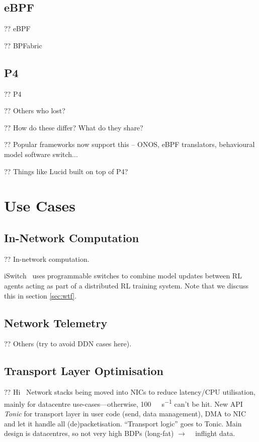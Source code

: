 \subsection{eBPF}
?? eBPF

?? BPFabric

\subsection{P4}
?? P4

?? Others who lost?

?? How do these differ? What do they share?

?? Popular frameworks now support this -- ONOS, eBPF translators, behavioural model software switch...

?? Things like Lucid built on top of P4?~\parencite{DBLP:conf/sigcomm/SonchackLRW21}

\section{Use Cases}

\subsection{In-Network Computation}\label{sec:in-network-computation}
?? In-network computation.

iSwitch~\cite{DBLP:conf/isca/LiLYCSH19} uses programmable switches to combine model updates between RL agents acting as part of a distributed RL training system.
Note that we discuss this in section \ref{sec:wtf}.

\subsection{Network Telemetry}
?? Others (try to avoid DDN cases here).

\subsection{Transport Layer Optimisation}
?? Hi~\parencite{DBLP:conf/nsdi/ArashlooLGRWW20} Network stacks being moved into NICs to reduce latency/CPU utilisation, mainly for datacentre use-cases---otherwise, \SI{100}{\giga\bit\per\second} can't be hit. New API \emph{Tonic} for transport layer in user code (send, data management), DMA to NIC and let it handle all (de)packetisation. ``Transport logic'' goes to Tonic. Main design is datacentres, so not very high BDPs (long-fat) $\rightarrow$ \si{\kilo\byte} inflight data.

